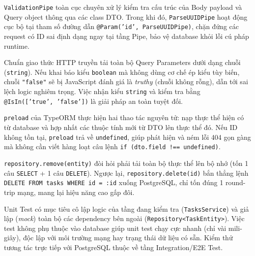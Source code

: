 \documentclass[12pt,a4paper,oneside]{book}
\begin{document}
\begin{qnabox}
  \texttt{ValidationPipe} toàn cục chuyên xử lý kiểm tra cấu trúc của Body payload và Query object thông qua các class DTO. Trong khi đó, \texttt{ParseUUIDPipe} hoạt động cục bộ tại tham số đường dẫn \texttt{@Param('id', ParseUUIDPipe)}, chặn đứng các request có ID sai định dạng ngay tại tầng Pipe, bảo vệ database khỏi lỗi cú pháp runtime.
\end{qnabox}

\begin{qnabox}
  Chuẩn giao thức HTTP truyền tải toàn bộ Query Parameters dưới dạng chuỗi (\texttt{string}). Nếu khai báo kiểu \texttt{boolean} mà không dùng cơ chế ép kiểu tùy biến, chuỗi \texttt{"false"} sẽ bị JavaScript đánh giá là \textit{truthy} (chuỗi không rỗng), dẫn tới sai lệch logic nghiêm trọng. Việc nhận kiểu \texttt{string} và kiểm tra bằng \texttt{@IsIn(['true', 'false'])} là giải pháp an toàn tuyệt đối.
\end{qnabox}

\begin{qnabox}
  \texttt{preload} của TypeORM thực hiện hai thao tác nguyên tử: nạp thực thể hiện có từ database và hợp nhất các thuộc tính mới từ DTO lên thực thể đó. Nếu ID không tồn tại, \texttt{preload} trả về \texttt{undefined}, giúp phát hiện và ném lỗi 404 gọn gàng mà không cần viết hàng loạt câu lệnh \texttt{if (dto.field !== undefined)}.
\end{qnabox}

\begin{qnabox}
  \texttt{repository.remove(entity)} đòi hỏi phải tải toàn bộ thực thể lên bộ nhớ (tốn 1 câu \texttt{SELECT} + 1 câu \texttt{DELETE}). Ngược lại, \texttt{repository.delete(id)} bắn thẳng lệnh \texttt{DELETE FROM tasks WHERE id = :id} xuống PostgreSQL, chỉ tốn đúng 1 round-trip mạng, mang lại hiệu năng cao gấp đôi.
\end{qnabox}

\begin{qnabox}
  Unit Test có mục tiêu cô lập logic của tầng đang kiểm tra (\texttt{TasksService}) và giả lập (\textit{mock}) toàn bộ các dependency bên ngoài (\texttt{Repository<TaskEntity>}). Việc test không phụ thuộc vào database giúp unit test chạy cực nhanh (chỉ vài mili-giây), độc lập với môi trường mạng hay trạng thái dữ liệu có sẵn. Kiểm thử tương tác trực tiếp với PostgreSQL thuộc về tầng Integration/E2E Test.
\end{qnabox}
\end{document}
